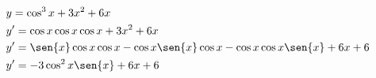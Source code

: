 \begin{ex}
\begin{align}
&y=\cos^3{x}+3x^2+6x\nonumber\\
&y'=\cos{x}\cos{x}\cos{x}+3x^2+6x\nonumber\\
&y'=\sen{x}\cos{x}\cos{x}-\cos{x}\sen{x}\cos{x}-\cos{x}\cos{x}\sen{x}+6x+6\nonumber\\
&y'=-3\cos^2{x}\sen{x}+6x+6\nonumber
\end{align}
\end{ex}